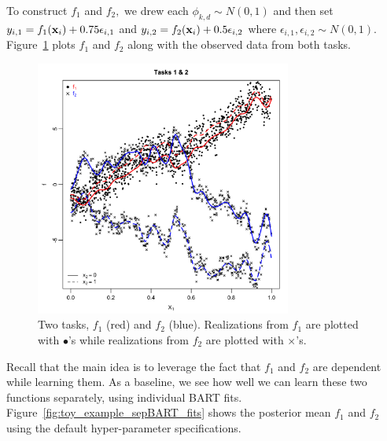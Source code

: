 \documentclass[12pt]{article}
\begin{document}
To construct $f_{1}$ and $f_{2},$ we drew each $\phi_{k,d} \sim N(0,1)$ and then set $y_{i,1} = f_{1}(\mathbf{x}_{i}) + 0.75\epsilon_{i,1}$ and $y_{i,2} = f_{2}(\mathbf{x}_{i}) + 0.5\epsilon_{i,2}$ where $\epsilon_{i,1}, \epsilon_{i,2} \sim N(0,1).$
Figure~\ref{fig:toy_example_data} plots $f_{1}$ and $f_{2}$ along with the observed data from both tasks.

\begin{figure}[H]
\centering
\includegraphics[width = 0.75\textwidth]{../images/toy_example_data.png}
\caption{Two tasks, $f_{1}$ (red) and $f_{2}$ (blue). Realizations from $f_{1}$ are plotted with $\bullet$'s while realizations from $f_{2}$ are plotted with $\times$'s.}
\label{fig:toy_example_data}
\end{figure}

Recall that the main idea is to leverage the fact that $f_{1}$ and $f_{2}$ are dependent while learning them.
As a baseline, we see how well we can learn these two functions separately, using individual BART fits.
Figure~\ref{fig:toy_example_sepBART_fits} shows the posterior mean $f_{1}$ and $f_{2}$ using the default hyper-parameter specifications.
\end{document}
